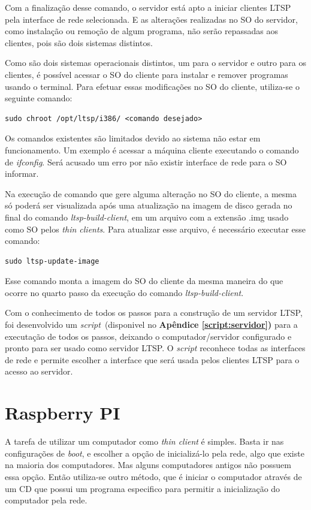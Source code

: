 \documentclass[
	12pt,				%
	openright,			%
	twoside,			%
	a4paper,			%
	chapter=TITLE,		%
	english,			%
	brazil				%
	]{abntex2}
\begin{document}
Com a finalização desse comando, o servidor está apto a iniciar clientes LTSP pela interface de rede selecionada. E as alterações realizadas no SO do servidor, como instalação ou remoção de algum programa, não serão repassadas aos clientes, pois são dois sistemas distintos.

Como são dois sistemas operacionais distintos, um para o servidor e outro para os clientes, é possível acessar o SO do cliente para instalar e remover programas usando o terminal. Para efetuar essas modificações no SO do cliente, utiliza-se o seguinte comando:
\begin{verbatim}
sudo chroot /opt/ltsp/i386/ <comando desejado>
\end{verbatim}

Os comandos existentes são limitados devido ao sistema não estar em funcionamento. Um exemplo é acessar a máquina cliente executando o comando de \textit{ifconfig}. Será acusado um erro por não existir interface de rede para o SO informar.

Na execução de comando que gere alguma alteração no SO do cliente, a mesma só poderá ser visualizada após uma atualização na imagem de disco gerada no final do comando \textit{ltsp-build-client}, em um arquivo com a extensão .img usado como SO pelos \textit{thin clients}. Para atualizar esse arquivo, é necessário executar esse comando:
\begin{verbatim}
sudo ltsp-update-image
\end{verbatim}

Esse comando monta a imagem do SO do cliente da mesma maneira do que ocorre no quarto passo da execução do comando  \textit{ltsp-build-client}.

Com o conhecimento de todos os passos para a construção de um servidor LTSP, foi desenvolvido um \textit{script}\ (disponivel no \textbf{Apêndice \ref{script:servidor})} para a executação de todos os passos, deixando o computador/servidor configurado e pronto para ser usado como servidor LTSP. O \textit{script} reconhece todas as interfaces de rede e permite escolher a interface que será usada pelos clientes LTSP para o acesso ao servidor. 

\section{Raspberry PI}
\label{confRasp}

A tarefa de utilizar um computador como \textit{thin client} é simples. Basta ir nas configurações de \textit{boot}, e escolher a opção de inicializá-lo pela rede, algo que existe na maioria dos computadores. Mas alguns computadores antigos não possuem essa opção. Então utiliza-se outro método, que é iniciar o computador através de um CD que possui um programa especifico para permitir a inicialização do computador pela rede.
\end{document}
